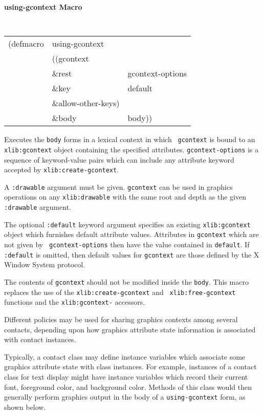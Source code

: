 \documentclass[twoside]{book}
\begin{document}
\begin{sloppy}
{\samepage
{\large {\bf using-gcontext \hfill Macro}} 
\begin{flushright} \parbox[t]{6.125in}{
\tt
\begin{tabular}{lll}
\raggedright
(defmacro & using-gcontext & \\ 
& ((gcontext \\
& \&rest & gcontext-options\\ 
& \&key  & default \\
& \&allow-other-keys)\\
& \&body  &body))
\end{tabular}
\rm

}\end{flushright}}

\begin{flushright} \parbox[t]{6.125in}{
Executes the {\tt body} forms in a lexical context in which {\tt
gcontext} is bound to an {\tt xlib:gcontext} object containing the
specified attributes. {\tt gcontext-options} is a sequence of
keyword-value pairs which can include any attribute keyword accepted by
{\tt xlib:create-gcontext}.

A {\tt :drawable} argument must be given.  
{\tt gcontext} can be used in
graphics operations on any {\tt xlib:drawable} with the same root and depth as
the given {\tt :drawable} argument.


The optional {\tt :default} keyword argument specifies an existing
{\tt xlib:gcontext} object which furnishes default attribute values.
Attributes in {\tt gcontext} which are not given by {\tt
gcontext-options} then have the value contained in {\tt default}.
If {\tt :default} is omitted, then default values for {\tt gcontext} are
those defined by the X Window System protocol.

The contents of {\tt gcontext} should not be modified inside the {\tt body}.
This macro replaces the use of the {\tt xlib:create-gcontext} and {\tt
xlib:free-gcontext} functions and the {\tt xlib:gcontext-} accessors.

}\end{flushright}


Different policies may be used for sharing graphics contexts among
several contacts, depending upon how graphics attribute state information is
associated with contact instances.

Typically, a contact class may define instance variables which associate
some graphics attribute state with class instances. For example,
instances of a contact class for text display might have instance
variables
which record their current font, foreground color, and background color.
Methods of this class would then generally perform graphics output
in the body of a {\tt using-gcontext} form, as shown below.


\end{sloppy}
\end{document}
